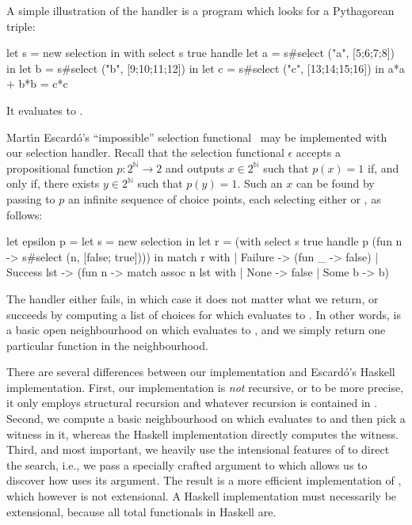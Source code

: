 A simple illustration of the handler is a program which looks for a Pythagorean triple:
%
\begin{source}
let s = new selection in
with select s true handle
  let a = s#select ("a", [5;6;7;8]) in
  let b = s#select ("b", [9;10;11;12]) in
  let c = s#select ("c", [13;14;15;16]) in
    a*a + b*b = c*c
\end{source}
%
It evaluates to .

Mart{\'\i}n Escard{\'o}'s ``impossible'' selection functional~\cite{escardo10selection} may be implemented with our selection handler. Recall that the selection functional $\epsilon$ accepts a propositional function $p : 2^\mathbb{N} \to 2$ and outputs $x \in 2^\mathbb{N}$ such that $p(x) = 1$ if, and only if, there exists $y \in 2^\mathbb{N}$ such that $p(y) = 1$. Such an $x$ can be found by passing to $p$ an infinite sequence of choice points, each selecting either  or , as follows:
%
\begin{source}
let epsilon p =
  let s = new selection in
  let r = (with select s true handle
             p (fun n -> s#select (n, [false; true])))
  in
    match r with
      | Failure -> (fun _ -> false)
      | Success lst ->
        (fun n -> match assoc n lst with
                  | None -> false | Some b -> b)
\end{source}
%
The  handler either fails, in which case it does not matter what we return, or succeeds by computing a list of choices for which  evaluates to . In other words,  is a basic open neighbourhood on which  evaluates to , and we simply return one particular function in the neighbourhood.

There are several differences between our implementation and Escard{\'o}'s Haskell implementation. First, our implementation is \emph{not} recursive, or to be more precise, it only employs structural recursion and whatever recursion is contained in . Second, we compute a basic neighbourhood on which  evaluates to  and then pick a witness in it, whereas the Haskell implementation directly computes the witness. Third, and most important, we heavily use the intensional features of \eff to direct the search, i.e., we pass a specially crafted argument to  which allows us to discover how  uses its argument. The result is a more efficient implementation of , which however is not extensional. A Haskell implementation must necessarily be extensional, because all total functionals in Haskell are.

